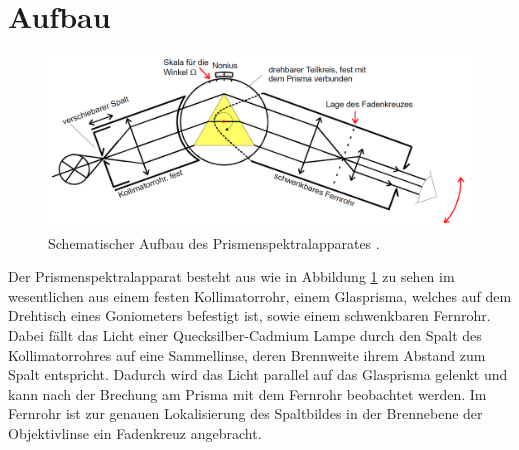 \section{Aufbau}
\label{sec:Aufbau}

\begin{figure}
\centering
\includegraphics[width=\linewidth-50pt,height=\textheight-50pt,keepaspectratio]{content/images/aufbau.png}
\caption{Schematischer Aufbau des Prismenspektralapparates \cite{V402}.}
\label{fig:aufbau}
\end{figure}

\noindent Der Prismenspektralapparat besteht aus wie in Abbildung \ref{fig:aufbau} zu sehen im wesentlichen aus einem festen Kollimatorrohr, einem Glasprisma, welches auf dem Drehtisch eines Goniometers befestigt ist, sowie einem schwenkbaren Fernrohr. Dabei fällt das Licht einer Quecksilber-Cadmium Lampe durch den Spalt des Kollimatorrohres auf eine Sammellinse, deren Brennweite ihrem Abstand zum Spalt entspricht. Dadurch wird das Licht parallel auf das Glasprisma gelenkt und kann nach der Brechung am Prisma mit dem Fernrohr beobachtet werden. Im Fernrohr ist zur genauen Lokalisierung des Spaltbildes in der Brennebene der Objektivlinse ein Fadenkreuz angebracht.